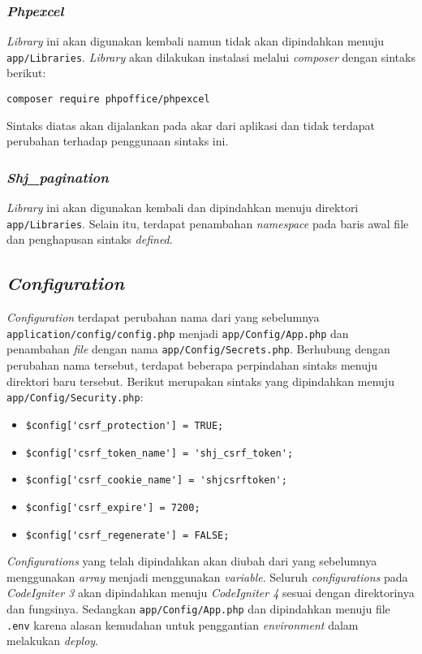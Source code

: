 \subsubsection{\textit{Phpexcel}}
\textit{Library} ini akan digunakan kembali namun tidak akan dipindahkan menuju \texttt{app/Libraries}. \textit{Library} akan dilakukan instalasi melalui \textit{composer} dengan sintaks berikut:
\begin{center}
	\verb|composer require phpoffice/phpexcel|
\end{center}
Sintaks diatas akan dijalankan pada akar dari aplikasi dan tidak terdapat perubahan terhadap penggunaan sintaks ini.
\subsubsection{\textit{Shj\_pagination}}
\textit{Library} ini akan digunakan kembali dan dipindahkan menuju direktori \texttt{app/Libraries}. Selain itu, terdapat penambahan \textit{namespace} pada baris awal file dan penghapusan sintaks \textit{defined}.

\subsection{\textit{Configuration}}
\textit{Configuration} terdapat perubahan nama dari yang sebelumnya \texttt{application/config/config.php} menjadi \texttt{app/Config/App.php} dan penambahan \textit{file} dengan nama \texttt{app/Config/Secrets.php}. Berhubung dengan perubahan nama tersebut, terdapat beberapa perpindahan sintaks menuju direktori baru tersebut. Berikut merupakan sintaks yang dipindahkan menuju \texttt{app/Config/Security.php}:
\begin{itemize}
\item \verb|$config['csrf_protection'] = TRUE;|
\item \verb|$config['csrf_token_name'] = 'shj_csrf_token';|
\item \verb|$config['csrf_cookie_name'] = 'shjcsrftoken';|
\item \verb|$config['csrf_expire'] = 7200;|
\item \verb|$config['csrf_regenerate'] = FALSE;|
\end{itemize}

\textit{Configurations} yang telah dipindahkan akan diubah dari yang sebelumnya menggunakan \textit{array} menjadi menggunakan \textit{variable}. Seluruh \textit{configurations} pada \textit{CodeIgniter 3} akan dipindahkan menuju \textit{CodeIgniter 4} sesuai dengan direktorinya dan fungsinya. Sedangkan \texttt{app/Config/App.php} dan dipindahkan menuju file \texttt{.env} karena alasan kemudahan untuk penggantian \textit{environment} dalam melakukan \textit{deploy}.

